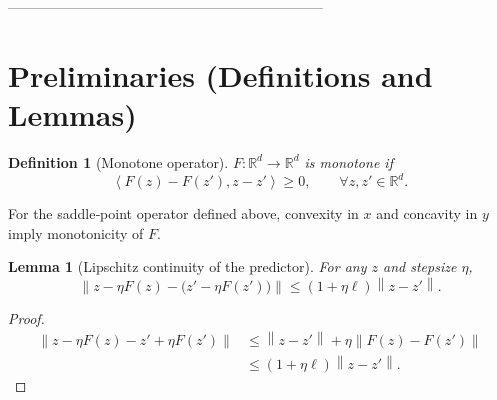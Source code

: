 \documentclass{article}
\newtheorem{lemma}{Lemma}
\newtheorem{definition}{Definition}
\newcommand{\R}{\mathbb{R}}
\newcommand{\norm}[1]{\left\lVert #1\right\rVert}
\newcommand{\inner}[2]{\left\langle #1,#2\right\rangle}
\begin{document}
--------------------------------------------------------------------
\section*{Preliminaries (Definitions and Lemmas)}
\begin{definition}[Monotone operator]
\(F:\R^{d}\to\R^{d}\) is monotone if
\[
\inner{F(z)-F(z')}{z-z'}\ge 0,\qquad\forall z,z'\in\R^{d}.
\]
\end{definition}
For the saddle‑point operator defined above, convexity in \(x\) and concavity in
\(y\) imply monotonicity of \(F\).

\begin{lemma}[Lipschitz continuity of the predictor]\label{lem:predictor}
For any \(z\) and stepsize \(\eta\),
\[
\norm{z-\eta F(z)-\bigl(z'-\eta F(z')\bigr)}\le (1+\eta\ell)\norm{z-z'}.
\]
\end{lemma}
\begin{proof}
\[
\begin{aligned}
\norm{z-\eta F(z)-z'+\eta F(z')}
&\le \norm{z-z'}+\eta\norm{F(z)-F(z')}\\
&\le (1+\eta\ell)\norm{z-z'}.
\end{aligned}
\]
\end{proof}
\end{document}
